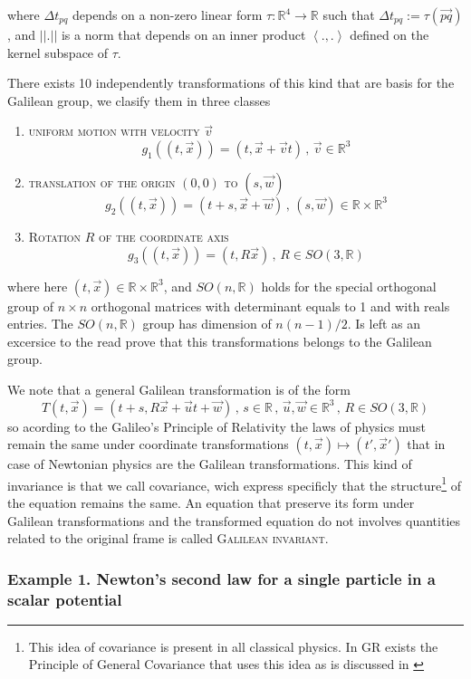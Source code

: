 \documentclass[11pt, letterpaper]{article}
\def\Re{\mathbb{R}}
\begin{document}
where $\Delta t_{pq}$ depends on a non-zero linear form $\tau:\Re^4\to\Re$ such that $\Delta t_{pq}:=\tau(\overrightarrow{pq})$, and $||.||$ is a norm that depends on an inner product $\left<.,.\right>$ defined on the kernel subspace of $\tau$.

There exists 10 independently transformations of this kind that are basis for the Galilean group, we clasify them in three classes
\begin{enumerate}
	\item \textsc{uniform motion with velocity} $\vec{v}$
	$$g_1((t,\vec{x}))=(t,\vec{x}+\vec{v}t)\, , \, \vec{v}\in\Re^3$$
	\item \textsc{translation of the origin $(0,0)$ to $(s,\vec{w})$}
	$$g_2((t,\vec{x}))=(t+s,\vec{x}+\vec{w})\, , \, (s,\vec{w})\in\Re\times\Re^3 $$
	\item \textsc{Rotation $R$ of the coordinate axis}
	$$g_3((t,\vec{x}))=(t,R\vec{x})\, , \, R\in SO(3,\Re)$$
\end{enumerate}

where here $(t,\vec{x})\in \Re\times\Re^3$, and $SO(n,\Re)$ holds for the special orthogonal group of $n\times n$ orthogonal matrices with determinant equals to 1 and with reals entries. The $SO(n,\Re)$ group has dimension of $n(n-1)/2$. Is left as an excersice to the read prove that this transformations belongs to the Galilean group. 

We note that a general Galilean transformation is of the form
\begin{equation}
	T(t,\vec{x})=(t+s,R\vec{x}+\vec{u}t+\vec{w})\,,\, s\in\Re\,,\,\vec{u},\vec{w}\in\Re^3\,,\,R\in SO(3,\Re) \label{eq:generalT}
\end{equation}
so acording to the Galileo's Principle of Relativity the laws of physics must remain the same under coordinate transformations $(t,\vec{x})\mapsto (t',\vec{x}')$ that in case of Newtonian physics are the Galilean transformations. This kind of invariance is that we call covariance, wich express specificly that the structure\footnote{This idea of covariance is present in all classical physics. In GR exists the Principle of General Covariance that uses this idea as is discussed in \cite{weinberg}} of the equation remains the same. An equation that preserve its form under Galilean transformations and the transformed equation do not involves quantities related to the original frame is called \textsc{Galilean invariant}.

\subsubsection*{Example 1. Newton's second law for a single particle in a scalar potential}
\end{document}
